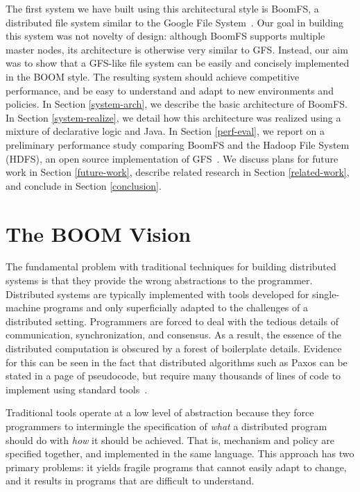 \documentclass[twocolumn]{article}
\begin{document}
The first system we have built using this architectural style is
BoomFS, a distributed file system similar to the Google File
System~\cite{gfs}. Our goal in building this system was not novelty of
design: although BoomFS supports multiple master nodes, its
architecture is otherwise very similar to GFS. Instead, our aim was to
show that a GFS-like file system can be easily and concisely
implemented in the BOOM style. The resulting system should achieve
competitive performance, and be easy to understand and adapt to new
environments and policies. In Section \ref{system-arch}, we describe
the basic architecture of BoomFS. In Section \ref{system-realize}, we
detail how this architecture was realized using a mixture of
declarative logic and Java. In Section \ref{perf-eval}, we report on a
preliminary performance study comparing BoomFS and the Hadoop File
System (HDFS), an open source implementation of
GFS~\cite{hdfs-arch}. We discuss plans for future work in Section
\ref{future-work}, describe related research in Section
\ref{related-work}, and conclude in Section \ref{conclusion}.

\section{The BOOM Vision}
\label{boom-vision}
The fundamental problem with traditional techniques for building
distributed systems is that they provide the wrong abstractions to the
programmer. Distributed systems are typically implemented with tools
developed for single-machine programs and only superficially adapted
to the challenges of a distributed setting. Programmers are forced to
deal with the tedious details of communication, synchronization, and
consensus. As a result, the essence of the distributed computation is
obscured by a forest of boilerplate details. Evidence for this can be
seen in the fact that distributed algorithms such as Paxos can be
stated in a page of pseudocode, but require many thousands of lines of
code to implement using standard tools~\cite{paxos-made-live}.

Traditional tools operate at a low level of abstraction because they
force programmers to intermingle the specification of \emph{what} a
distributed program should do with \emph{how} it should be
achieved. That is, mechanism and policy are specified together, and
implemented in the same language. This approach has two primary
problems: it yields fragile programs that cannot easily adapt to
change, and it results in programs that are difficult to understand.
\end{document}
